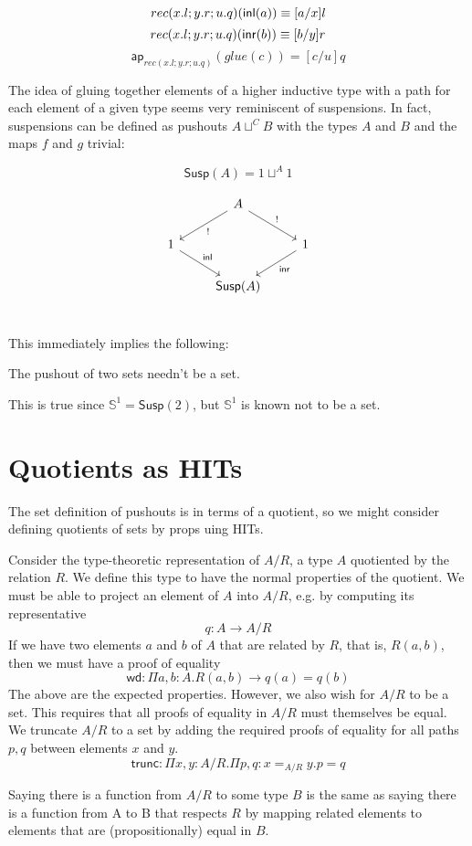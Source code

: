 \documentclass[11pt]{article}
\renewcommand{\SS}{\mathbb{S}}
\newcommand*{\ap}{\mathsf{ap}}
\newcommand{\susp}[1]{\mathsf{Susp}(#1)}
\begin{document}
$$rec(x.l; y.r; u.q)({\mathsf{inl}}(a)) \equiv [a/x]l$$
$$rec(x.l; y.r; u.q)({\mathsf{inr}}(b)) \equiv [b/y]r$$
$$\ap_{rec(x.l; y.r; u.q)}(glue(c)) = [c/u]q$$

The idea of gluing together elements of a higher inductive type with a path
for each element of a given type seems very reminiscent of suspensions. In
fact, suspensions can be defined as pushouts $A \sqcup^C B$ with the types
$A$ and $B$ and the maps $f$ and $g$ trivial:

$$\susp A = 1 \sqcup^A 1$$

\begin{equation*}
\begin{tikzcd}
{} & A \arrow{dr}{!} \arrow{dl}{!} & {}\\
1 \arrow{dr}{\inl} & {} & 1 \arrow{dl}{\inr} \\
{} & \susp{A} & {}\\
\end{tikzcd}
\end{equation*}

This immediately implies the following:
\begin{corr}The pushout of two sets needn't be a set.\end{corr}
This is true since $\SS^1 = \susp{2}$, but $\SS^1$ is known not to be a set.


\section{Quotients as HITs}
\newcommand{\trunc}{\mathsf{trunc}}
The set definition of pushouts is in terms of a quotient, so we might
consider defining quotients of sets by props uing HITs.

Consider the type-theoretic representation of $A/R$, a type $A$ quotiented
by the relation $R$. We define this type to have the normal properties of the
quotient. We must be able to project an element of $A$ into $A/R$, e.g. by
computing its representative
$$q : A \to A/R$$
If we have two elements $a$ and $b$ of $A$ that are related by $R$, that is,
$R(a, b)$, then we must have a proof of equality
$$\mathsf{wd}: \Pi a,b: A. R(a,b) \to q(a) = q(b)$$
The above are the expected properties. However, we also wish for
$A/R$ to be a set. This requires that all proofs of equality in $A/R$ must
themselves be equal. We truncate $A/R$ to a set by adding the required proofs
of equality for all paths $p, q$ between elements $x$ and $y$.
$$\trunc : \Pi x,y: A/R. \Pi p, q : x =_{A/R} y. p = q$$

Saying there is a function from $A/R$ to some type $B$ is the same as saying there is a function from A to B that respects $R$ by mapping related elements
to elements that are (propositionally) equal in $B$.
\end{document}
